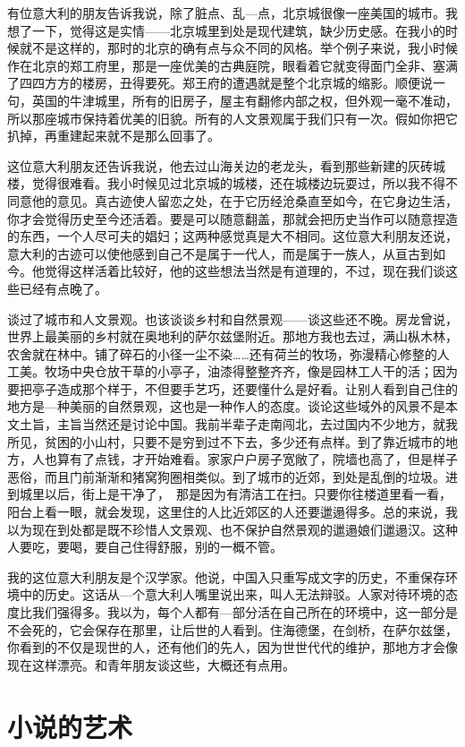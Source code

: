 有位意大利的朋友告诉我说，除了脏点、乱—点，北京城很像一座美国的城市。我想了一下，觉得这是实情——北京城里到处是现代建筑，缺少历史感。在我小的时候就不是这样的，那时的北京的确有点与众不同的风格。举个例子来说，我小时候作在北京的郑工府里，那是一座优美的古典庭院，眼看着它就变得面门全非、塞满了四四方方的楼房，丑得要死。郑王府的遭遇就是整个北京城的缩影。顺便说一句，英国的牛津城里，所有的旧房子，屋主有翻修内部之权，但外观一毫不准动，所以那座城市保持着优美的旧貌。所有的人文景观属于我们只有一次。假如你把它扒掉，再重建起来就不是那么回事了。 

这位意大利朋友还告诉我说，他去过山海关边的老龙头，看到那些新建的灰砖城楼，觉得很难看。我小时候见过北京城的城楼，还在城楼边玩耍过，所以我不得不同意他的意见。真古迹使人留恋之处，在于它历经沧桑直至如今，在它身边生活，你才会觉得历史至今还活着。要是可以随意翻盖，那就会把历史当作可以随意捏造的东西，一个人尽可夫的娼妇；这两种感觉真是大不相同。这位意大利朋友还说，意大利的古迹可以使他感到自己不是属于一代人，而是属于一族人，从亘古到如今。他觉得这样活着比较好，他的这些想法当然是有道理的，不过，现在我们谈这些已经有点晚了。 

谈过了城市和人文景观。也该谈谈乡村和自然景观——谈这些还不晚。房龙曾说，世界上最美丽的乡村就在奥地利的萨尔兹堡附近。那地方我也去过，满山枞木林，农舍就在林中。铺了碎石的小径一尘不染……还有荷兰的牧场，弥漫精心修整的人工美。牧场中央仓放干草的小亭子，油漆得整整齐齐，像是园林工人干的活；因为要把亭子造成那个样于，不但要手艺巧，还要懂什么是好看。让别人看到自己住的地方是—种美丽的自然景观，这也是一种作人的态度。谈论这些域外的风景不是本文土旨，主旨当然还是讨论中国。我前半辈子走南闯北，去过国内不少地方，就我所见，贫困的小山村，只要不是穷到过不下去，多少还有点样。到了靠近城市的地方，人也算有了点钱，才开始难看。家家户户房子宽敞了，院墙也高了，但是样子恶俗，而且门前渐渐和猪窝狗圈相类似。到了城市的近郊，到处是乱倒的垃圾。进到城里以后，街上是干净了，　那是因为有清洁工在扫。只要你往楼道里看一看，阳台上看一眼，就会发现，这里住的人比近郊区的人还要邋遢得多。总的来说，我以为现在到处都是既不珍惜人文景观、也不保护自然景观的邋遢娘们邋遢汉。这种人要吃，要喝，要自己住得舒服，别的一概不管。 

我的这位意大利朋友是个汉学家。他说，中国入只重写成文字的历史，不重保存环境中的历史。这话从—个意大利人嘴里说出来，叫人无法辩驳。人家对待环境的态度比我们强得多。我以为，每个人都有—部分活在自己所在的环境中，这一部分是不会死的，它会保存在那里，让后世的人看到。住海德堡，在剑桥，在萨尔兹堡，你看到的不仅是现世的人，还有他们的先人，因为世世代代的维护，那地方才会像现在这样漂亮。和青年朋友谈这些，大概还有点用。

\chapter{小说的艺术} 

